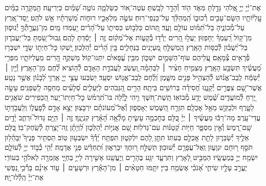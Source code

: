 \documentclass[twoside, openany, parskip=half, 11pt]{book}
\begin{document}
\newcommand{\RChBarekhi}{
\instruction{:בראש חודש}
\firstword{בָּרְ֯כִ֥י נַפְשִׁ֗י } \source{תהלים קד}
אֶת־יְ֫יָ֥ יְיָ֣ אֱ֭לֹהַי גָּדַ֣לְתָּ מְּאֹ֑ד ה֖וֹד וְ֯הָדָ֣ר לָבָֽשְׁתָּ׃
עֹֽטֶה־א֭וֹר כַּשַּׂלְמָ֑ה נוֹטֶ֥ה שָׁ֝מַ֗יִם כַּיְרִיעָֽה׃
הַ֥מְקָרֶ֥ה בַמַּ֗יִם עֲֽלִיּ֫וֹתָ֥יו הַשָּׂם־עָבִ֥ים רְ֯כוּב֑וֹ הַֽ֝מְהַלֵּ֗ךְ עַל־כַּנְפֵי־רֽוּחַ׃
עֹשֶׂ֣ה מַלְאָכָ֣יו רוּח֑וֹת מְ֝שָׁרְתָ֗יו אֵ֣שׁ לֹהֵֽט׃
יָֽסַד־אֶ֭רֶץ עַל־מְ֯כוֹנֶ֑יהָ בַּל־תִּ֝מּ֗וֹט עוֹלָ֥ם וָעֶֽד׃
תְּ֭הוֹם כַּלְּב֣וּשׁ כִּסִּית֑וֹ עַל־הָ֝רִ֗ים יַ֖עַמְדוּ מָֽיִם׃
מִן־גַּעֲרָ֣תְ֯ךָ֣ יְ֯נוּס֑וּן מִן־ק֥וֹל רַֽ֝עַמְךָ֗ יֵחָפֵזֽוּן׃
יַעֲל֣וּ הָ֭רִים יֵרְ֯ד֣וּ בְ֯קָע֑וֹת אֶל־מְ֝ק֗וֹם זֶ֤ה ׀ יָסַ֬דְתָּ לָהֶֽם׃
גְּֽבוּל־שַׂ֭מְתָּ בַּל־יַעֲבֹר֑וּן בַּל־יְ֝שֻׁב֗וּן לְ֯כַסּ֥וֹת הָאָֽרֶץ׃
הַֽמְשַׁלֵּ֣חַ מַ֭עְיָנִים בַּנְּחָלִ֑ים בֵּ֥ין הָ֝רִ֗ים יְ֯הַלֵּכֽוּן׃
יַ֭שְׁקוּ כׇּל־חַיְת֣וֹ שָׂדָ֑י יִשְׁבְּר֖וּ פְ֯רָאִ֣ים צְ֯מָאָֽם׃
עֲ֭לֵיהֶם עוֹף־הַשָּׁמַ֣יִם יִשְׁכּ֑וֹן מִבֵּ֥ין עֳ֝פָאיִ֗ם יִתְּנוּ־קֽוֹל׃
מַשְׁקֶ֣ה הָ֭רִים מֵעֲלִיּוֹתָ֑יו מִפְּרִ֥י מַ֝עֲשֶׂ֗יךָ תִּשְׂבַּ֥ע הָאָֽרֶץ׃
מַצְמִ֤יחַ חָצִ֨יר ׀ לַבְּהֵמָ֗ה וְ֭עֵשֶׂב לַעֲבֹדַ֣ת הָאָדָ֑ם לְ֯ה֥וֹצִיא לֶ֗֝חֶם מִן־הָאָֽרֶץ׃
וְ֯יַ֤יִן ׀ יְ֯שַׂמַּ֬ח לְֽבַב־אֱנ֗וֹשׁ לְ֯הַצְהִ֣יל פָּנִ֣ים מִשָּׁ֑מֶן וְ֝לֶ֗חֶם לְֽבַב־אֱנ֥וֹשׁ יִסְעָֽד׃
יִ֭שְׂבְּעוּ עֲצֵ֣י יְיָ֑ אַֽרְזֵ֥י לְ֝בָנ֗וֹן אֲשֶׁ֣ר נָטָֽע׃
אֲשֶׁר־שָׁ֭ם צִפֳּרִ֣ים יְ֯קַנֵּ֑נוּ חֲ֝סִידָ֗ה בְּרוֹשִׁ֥ים בֵּיתׇֽהּ׃
הָרִ֣ים הַ֭גְּבֹהִים לַיְּעֵלִ֑ים סְ֝לָעִ֗ים מַחְסֶ֥ה לַֽשְׁפַנִּֽים׃
עָשָׂ֣ה יָ֭רֵחַ לְ֯מוֹעֲדִ֑ים שֶׁ֝֗מֶשׁ יָדַ֥ע מְ֯בוֹאֽוֹ׃
תָּֽשֶׁת־חֹ֭שֶׁךְ וִ֣יהִי לָ֑יְ֯לָה בּוֹ־תִ֝רְמֹ֗שׂ כׇּל־חַיְתוֹ־יָֽעַר׃
הַ֭כְּפִירִים שֹׁאֲגִ֣ים לַטָּ֑רֶף וּלְבַקֵּ֖שׁ מֵאֵ֣ל אׇכְלָֽם׃
תִּזְרַ֣ח הַ֭שֶּׁמֶשׁ יֵאָסֵפ֑וּן וְ֯אֶל־מְ֝עוֹנֹתָ֗ם יִרְבָּצֽוּן׃
יֵצֵ֣א אָדָ֣ם לְ֯פׇעֳל֑וֹ וְֽלַעֲבֹ֖דָת֣וֹ עֲדֵי־עָֽרֶב׃
מָה־רַבּ֬וּ מַעֲשֶׂ֨יךָ ׀ יְיָ֗ כֻּ֭לָּם בְּחׇכְמָ֣ה עָשִׂ֑יתָ מָלְ֯אָ֥ה הָ֝אָ֗רֶץ קִנְיָנֶֽךָ׃
זֶ֤ה ׀ הַיָּ֥ם גָּדוֹל֮ וּרְחַ֢ב יָ֫דָ֥יִם שָֽׁם־רֶ֭מֶשׂ וְ֯אֵ֣ין מִסְפָּ֑ר חַיּ֥וֹת קְ֝טַנּ֗וֹת עִם־גְּדֹלֽוֹת׃
שָׁ֭ם אֳנִיּ֣וֹת יְ֯הַלֵּכ֑וּן לִ֝וְיָתָ֗ן זֶֽה־יָצַ֥רְתָּ לְ֯שַֽׂחֶק־בּֽוֹ׃
כֻּ֭לָּם אֵלֶ֣יךָ יְ֯שַׂבֵּר֑וּן לָתֵ֖ת אׇכְלָ֣ם בְּעִתּֽוֹ׃
תִּתֵּ֣ן לָ֭הֶם יִלְקֹט֑וּן תִּפְתַּ֥ח יָ֝דְ֯ךָ֗ יִשְׂבְּע֥וּן טֽוֹב׃
תַּסְתִּ֥יר פָּנֶיךָ֮ יִֽבָּהֵ֫ל֥וּן תֹּסֵ֣ף ר֭וּחָם יִגְוָע֑וּן וְֽאֶל־עֲפָרָ֥ם יְ֯שׁוּבֽוּן׃
תְּשַׁלַּ֣ח ר֭וּחֲךָ יִבָּרֵא֑וּן וּ֝תְחַדֵּ֗שׁ פְּנֵ֣י אֲדָמָֽה׃
יְ֯הִ֤י כְ֯ב֣וֹד יְיָ֣ לְ֯עוֹלָ֑ם יִשְׂמַ֖ח יְיָ֣ בְּמַעֲשָֽׂיו׃
הַמַּבִּ֣יט לָ֭אָרֶץ וַתִּרְעָ֑ד יִגַּ֖ע בֶּהָרִ֣ים וְֽיֶעֱשָֽׁנוּ׃
אָשִׁ֣ירָה לַייָ֣ בְּחַיָּ֑י אֲזַמְּרָ֖ה לֵאלֹהַ֣י בְּעוֹדִֽי׃
יֶעֱרַ֣ב עָלָ֣יו שִׂיחִ֑י אָ֝נֹכִ֗י אֶשְׂמַ֥ח בַּייָ׃
יִתַּ֤מּוּ חַטָּאִ֨ים ׀ מִן־הָאָ֡רֶץ וּרְשָׁעִ֤ים ׀ ע֤וֹד אֵינָ֗ם בָּרְ֯כִ֣י נַ֭פְשִׁי אֶת־יְיָ֗ הַֽלְ֯לוּ־יׇֽהּ׃
}
\RChBarekhi
\end{document}
